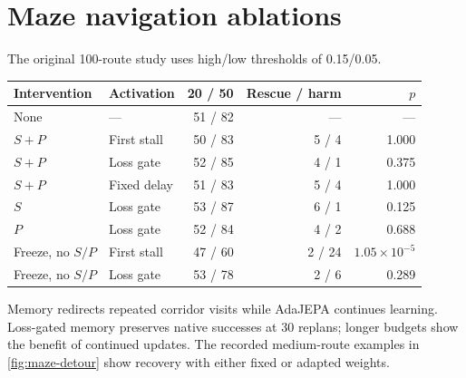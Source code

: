 \begin{table}[!t]
\begin{minipage}[t]{\columnwidth}
\section{Maze navigation ablations}
\label{sec:maze-details}
The original 100-route study uses high/low thresholds of 0.15/0.05.\par\smallskip
{\centering\par}\par

\end{minipage}\hfill
\begin{minipage}[t]{\columnwidth}
\vspace{0pt}
\par\smallskip
{\centering
{}
\label{tab:maze-full}
\small
\setlength{\tabcolsep}{2.1pt}
\begin{tabular}{@{}llrrr@{}}
\toprule
Intervention & Activation & 20 / 50 & Rescue / harm & $p$\\
\midrule
None & --- &51 / 82&---&---\\
$S{+}P$ & First stall &50 / 83&5 / 4&1.000\\
$S{+}P$ & Loss gate &52 / 85&4 / 1&0.375\\
$S{+}P$ & Fixed delay &51 / 83&5 / 4&1.000\\
$S$ & Loss gate &53 / 87&6 / 1&0.125\\
$P$ & Loss gate &52 / 84&4 / 2&0.688\\
Freeze, no $S/P$ & First stall &47 / 60&2 / 24&$1.05\!\times\!10^{-5}$\\
Freeze, no $S/P$ & Loss gate &53 / 78&2 / 6&0.289\\
\bottomrule
\end{tabular}
\par}
\par\smallskip
Memory redirects repeated corridor visits while AdaJEPA continues learning. Loss-gated memory preserves native successes at 30 replans; longer budgets show the benefit of continued updates. The recorded medium-route examples in \cref{fig:maze-detour} show recovery with either fixed or adapted weights.\par

\end{minipage}\par

\end{table}
